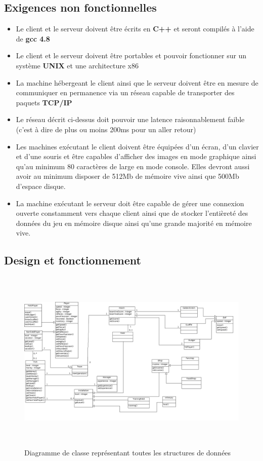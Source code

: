 \documentclass[a4paper]{article}
\begin{document}
\subsection{Exigences non fonctionnelles}
\label{enf}
\begin{itemize}
\item Le \gls{client} et le \gls{serveur} doivent être écrits en \textbf{C++} et seront compilés à l'aide de \textbf{gcc 4.8}
\item Le \gls{client} et le \gls{serveur} doivent être portables et pouvoir fonctionner sur un système \textbf{UNIX} et une architecture x86
\item La machine hébergeant le \gls{client} ainsi que le \gls{serveur} doivent être en mesure de communiquer en permanence via un réseau capable de transporter des paquets \textbf{TCP/IP}
\item Le réseau décrit ci-dessus doit pouvoir une latence raisonnablement faible (c'est à dire de plus ou moins 200ms pour un aller retour)
\item Les machines exécutant le \gls{client} doivent être équipées d'un écran, d'un clavier et d'une souris et être capables d'afficher des images en mode graphique ainsi qu'au minimum 80 caractères de large en mode console. Elles devront aussi avoir au minimum disposer de 512Mb de mémoire vive ainsi que 500Mb d'espace disque.
\item La machine exécutant le \gls{serveur} doit être capable de gérer une connexion ouverte constamment vers chaque \gls{client} ainsi que de stocker l'entièreté des données du jeu en mémoire disque ainsi qu'une grande majorité en mémoire vive.
\end{itemize}

\subsection{Design et fonctionnement}
\begin{figure}[h]
   \caption{\label{3} Diagramme de classe représentant toutes les structures de données}
   \begin{center}
   \includegraphics[height=250pt]{uml/classDiagram.png}
   \end{center}
\end{figure}

\printindex
\tableofcontents
\listoffigures
\end{document}
